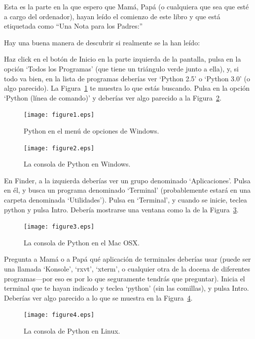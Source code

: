 Esta es la parte en la que espero que Mamá, Papá (o cualquiera que sea que esté a cargo del ordenador), hayan leído el comienzo de este libro y que está etiquetada como ``Una Nota para los Padres:''

\noindent
Hay una buena manera de descubrir si realmente se la han leído:

\begin{WINDOWS}
Haz click en el botón de Inicio en la parte izquierda de la pantalla, pulsa en la opción `Todos los Programas' (que tiene un triángulo verde junto a ella), y, si todo va bien, en la lista de programas deberías ver `Python 2.5' o `Python 3.0' (o algo parecido). La Figura~\ref{fig1} te muestra lo que estás buscando. Pulsa en la opción `Python (línea de comando)' y deberías ver algo parecido a la Figura~\ref{fig2}.

\begin{figure}
\begin{center}
\texttt{[image: figure1.eps]}
\end{center}
\caption{Python en el menú de opciones de Windows.}\label{fig1}
\end{figure}

\begin{figure}
\begin{center}
\texttt{[image: figure2.eps]}
\end{center}
\caption{La consola de Python en Windows.}\label{fig2}
\end{figure}
\end{WINDOWS}

\begin{MAC}
En Finder, a la izquierda deberías ver un grupo denominado `Aplicaciones'. Pulsa en él, y busca un programa denominado `Terminal' (probablemente estará en una carpeta denominada `Utilidades').
Pulsa en `Terminal', y cuando se inicie, teclea python y pulsa Intro. Debería mostrarse una ventana como la de la Figura~\ref{fig3}.

\begin{figure}
\begin{center}
\texttt{[image: figure3.eps]}
\end{center}
\caption{La consola de Python en el Mac OSX.}\label{fig3}
\end{figure}
\end{MAC}

\begin{LINUX}
Pregunta a Mamá o a Papá qué aplicación de terminales deberías usar (puede ser una llamada `Konsole', `rxvt', `xterm', o cualquier otra de la docena de diferentes programas---por eso es por lo que seguramente tendrás que preguntar). Inicia el terminal que te hayan indicado y teclea `python' (sin las comillas), y pulsa Intro. Deberías ver algo parecido a lo que se muestra en la Figura~\ref{fig4}.

\begin{figure}
\begin{center}
\texttt{[image: figure4.eps]}
\end{center}
\caption{La consola de Python en Linux.}\label{fig4}
\end{figure}
\end{LINUX}

